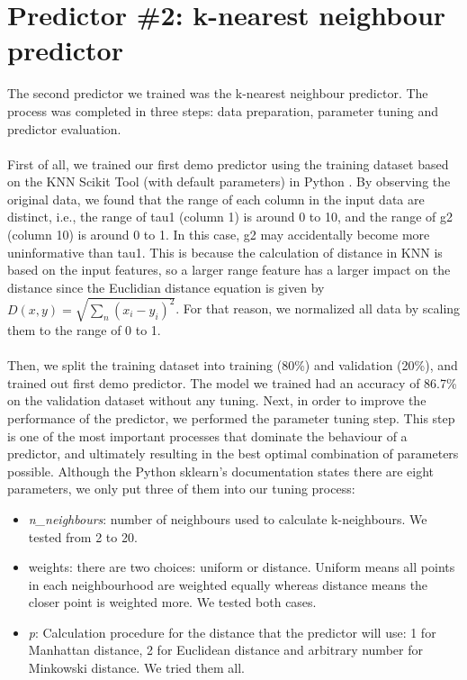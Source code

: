 \documentclass{article}
\newcommand{\enterProblemHeader}[1]{
\nobreak\extramarks{#1}{#1}\nobreak
\nobreak\extramarks{#1}{#1}\nobreak
}
\newcommand{\exitProblemHeader}[1]{
\nobreak\extramarks{#1}{#1}\nobreak
\nobreak\extramarks{#1}{}\nobreak
}
\newcounter{homeworkProblemCounter} %
\newcommand{\homeworkProblemName}{}
\newenvironment{homeworkProblem}[1][Problem \arabic{homeworkProblemCounter}]{ %
\stepcounter{homeworkProblemCounter} %
\renewcommand{\homeworkProblemName}{#1} %
\section{\homeworkProblemName} %
\enterProblemHeader{} %
}{
\exitProblemHeader{} %
}
\begin{document}
\clearpage
\begin{homeworkProblem}[Predictor \#2: k-nearest neighbour predictor]
The second predictor we trained was the k-nearest neighbour predictor. The process was completed in three steps: data preparation, parameter tuning and predictor evaluation.
\\
\\
First of all, we trained our first demo predictor using the training dataset based on the KNN Scikit Tool (with default parameters) in Python \cite{knn}. By observing the original data, we found that the range of each column in the input data are distinct, i.e., the range of tau1 (column 1) is around 0 to 10, and the range of g2 (column 10) is around 0 to 1. In this case, g2 may accidentally become more uninformative than tau1. This is because the calculation of distance in KNN is based on the input features, so a larger range feature has a larger impact on the distance since the Euclidian distance equation is given by $D(x,y) = \sqrt{\sum_n (x_i-y_i)^2}$. For that reason, we normalized all data by scaling them to the range of 0 to 1. 
\\
\\
Then, we split the training dataset into training (80\%) and validation (20\%), and trained out first demo predictor. The model we trained had an accuracy of 86.7\% on the validation dataset without any tuning. Next, in order to improve the performance of the predictor, we performed the parameter tuning step. This step is one of the most important processes that dominate the behaviour of a predictor, and ultimately resulting in the best optimal combination of parameters possible. Although the Python sklearn’s documentation states there are eight parameters, we only put three of them into our tuning process:
\begin{itemize}
    \item \textit{n\_neighbours}: number of neighbours used to calculate k-neighbours. We tested from 2 to 20.
    \item  weights: there are two choices: uniform or distance. Uniform means all points in each neighbourhood are weighted equally whereas distance means the closer point is weighted more. We tested both cases.
    \item \textit{p}: Calculation procedure for the distance that the predictor will use:  1 for Manhattan distance, 2 for Euclidean distance and arbitrary number for Minkowski distance. We tried them all. 
\end{itemize}

\end{homeworkProblem}
\end{document}
